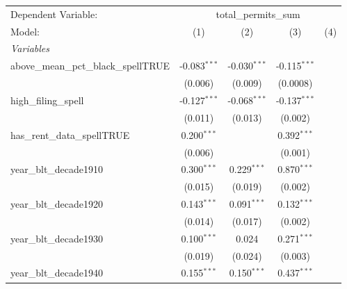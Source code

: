 \begingroup
\centering
\begin{tabular}{lcccc}
   \tabularnewline \midrule \midrule
   Dependent Variable: & \multicolumn{4}{c}{total\_permits\_sum}\\
   Model:                                                      & (1)            & (2)            & (3)            & (4)\\  
   \midrule
   \emph{Variables}\\
   above\_mean\_pct\_black\_spellTRUE                          & -0.083$^{***}$ & -0.030$^{***}$ & -0.115$^{***}$ &   \\   
                                                               & (0.006)        & (0.009)        & (0.0008)       &   \\   
   high\_filing\_spell                                         & -0.127$^{***}$ & -0.068$^{***}$ & -0.137$^{***}$ &   \\   
                                                               & (0.011)        & (0.013)        & (0.002)        &   \\   
   has\_rent\_data\_spellTRUE                                  & 0.200$^{***}$  &                & 0.392$^{***}$  &   \\   
                                                               & (0.006)        &                & (0.001)        &   \\   
   year\_blt\_decade1910                                       & 0.300$^{***}$  & 0.229$^{***}$  & 0.870$^{***}$  &   \\   
                                                               & (0.015)        & (0.019)        & (0.002)        &   \\   
   year\_blt\_decade1920                                       & 0.143$^{***}$  & 0.091$^{***}$  & 0.132$^{***}$  &   \\   
                                                               & (0.014)        & (0.017)        & (0.002)        &   \\   
   year\_blt\_decade1930                                       & 0.100$^{***}$  & 0.024          & 0.271$^{***}$  &   \\   
                                                               & (0.019)        & (0.024)        & (0.003)        &   \\   
   year\_blt\_decade1940                                       & 0.155$^{***}$  & 0.150$^{***}$  & 0.437$^{***}$  &   \\   

\end{tabular}

